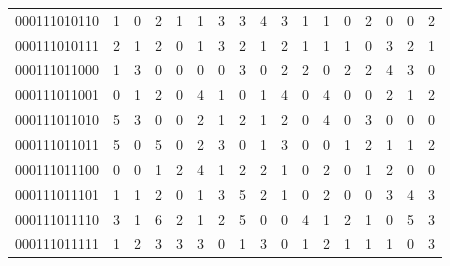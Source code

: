 \documentclass[10pt,a4paper]{article}
\begin{document}
\begin{longtable}{ |c|c|c|c|c|c|c|c|c|c|c|c|c|c|c|c|c| }
    000111010110              & 1                            & 0                                & 2                            & 1                              & 1   & 3   & 3   & 4   & 3   & 1   & 1   & 0   & 2   & 0   & 0   & 2   \\
    000111010111              & 2                            & 1                                & 2                            & 0                              & 1   & 3   & 2   & 1   & 2   & 1   & 1   & 1   & 0   & 3   & 2   & 1   \\
    000111011000              & 1                            & 3                                & 0                            & 0                              & 0   & 0   & 3   & 0   & 2   & 2   & 0   & 2   & 2   & 4   & 3   & 0   \\
    000111011001              & 0                            & 1                                & 2                            & 0                              & 4   & 1   & 0   & 1   & 4   & 0   & 4   & 0   & 0   & 2   & 1   & 2   \\
    000111011010              & 5                            & 3                                & 0                            & 0                              & 2   & 1   & 2   & 1   & 2   & 0   & 4   & 0   & 3   & 0   & 0   & 0   \\
    000111011011              & 5                            & 0                                & 5                            & 0                              & 2   & 3   & 0   & 1   & 3   & 0   & 0   & 1   & 2   & 1   & 1   & 2   \\
    000111011100              & 0                            & 0                                & 1                            & 2                              & 4   & 1   & 2   & 2   & 1   & 0   & 2   & 0   & 1   & 2   & 0   & 0   \\
    000111011101              & 1                            & 1                                & 2                            & 0                              & 1   & 3   & 5   & 2   & 1   & 0   & 2   & 0   & 0   & 3   & 4   & 3   \\
    000111011110              & 3                            & 1                                & 6                            & 2                              & 1   & 2   & 5   & 0   & 0   & 4   & 1   & 2   & 1   & 0   & 5   & 3   \\
    000111011111              & 1                            & 2                                & 3                            & 3                              & 3   & 0   & 1   & 3   & 0   & 1   & 2   & 1   & 1   & 1   & 0   & 3   \\

\end{longtable}
\end{document}
